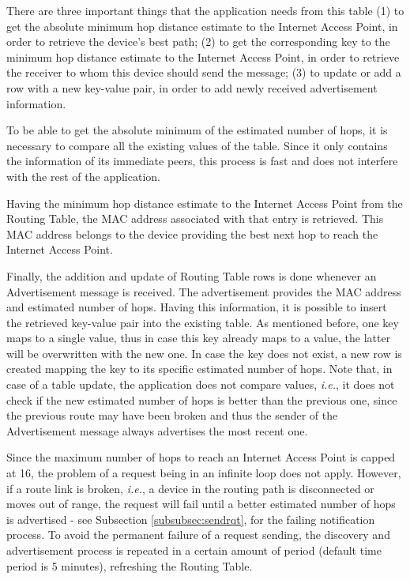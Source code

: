 There are three important things that the application needs from this table (1) to get the absolute minimum hop distance estimate to the Internet Access Point, in order to retrieve the device's best path; (2) to get the corresponding key to the minimum hop distance estimate to the Internet Access Point, in order to retrieve the receiver to whom this device should send the message; (3) to update or add a row with a new key-value pair, in order to add newly received advertisement information.

To be able to get the absolute minimum of the estimated number of hops, it is necessary to compare all the existing values of the table. Since it only contains the information of its immediate peers, this process is fast and does not interfere with the rest of the application.

Having the minimum hop distance estimate to the Internet Access Point from the Routing Table, the \gls{MAC} address associated with that entry is retrieved. This \gls{MAC} address belongs to the device providing the best next hop to reach the Internet Access Point.

Finally, the addition and update of Routing Table rows is done whenever an Advertisement message is received. The advertisement provides the \gls{MAC} address and estimated number of hops. Having this information, it is possible to insert the retrieved key-value pair into the existing table. As mentioned before, one key maps to a single value, thus in case this key already maps to a value, the latter will be overwritten with the new one. In case the key does not exist, a new row is created mapping the key to its specific estimated number of hops. Note that, in case of a table update, the application does not compare values, \textit{i.e.}, it does not check if the new estimated number of hops is better than the previous one, since the previous route may have been broken and thus the sender of the Advertisement message always advertises the most recent one.

Since the maximum number of hops to reach an Internet Access Point is capped at 16, the problem of a request being in an infinite loop does not apply. However, if a route link is broken, \textit{i.e.}, a device in the routing path is disconnected or moves out of range, the request will fail until a better estimated number of hops is advertised - see Subsection \ref{subsubsec:sendrqt}, for the failing notification process. To avoid the permanent failure of a request sending, the discovery and advertisement process is repeated in a certain amount of period (default time period is 5 minutes), refreshing the Routing Table.

